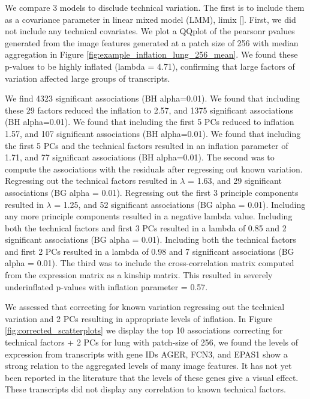 \documentclass[graybox]{svmult}
\begin{document}
We compare 3 models to disclude technical variation.
The first is to include them as a covariance parameter in linear mixed model (LMM), limix []. First, we did not include any technical covariates. We plot a QQplot of the pearsonr pvalues generated from the image features generated at a patch size of 256 with median aggregation in Figure \ref{fig:example_inflation_lung_256_mean}. We found these p-values to be highly inflated (lambda = 4.71), confirming that large factors of variation affected large groups of transcripts. 


We find 4323 significant associations (BH alpha=0.01). We found that including these 29 factors reduced the inflation to 2.57, and 1375 significant associations (BH alpha=0.01). We found that including the first 5 PCs reduced to inflation 1.57, and 107 significant associations (BH alpha=0.01). We found that including the first 5 PCs and the technical factors resulted in an inflation parameter of 1.71, and 77 significant associations (BH alpha=0.01).
The second was to compute the associations with the residuals after regressing out known variation. Regressing out the technical factors resulted in $\lambda$ = 1.63, and 29 significant associations (BG alpha = 0.01).  Regressing out the first 3 principle components resulted in $\lambda$ = 1.25, and 52 significant associations (BG alpha = 0.01). Including any more principle components resulted in a negative lambda value. Including both the technical factors and first 3 PCs resulted in a lambda of 0.85 and 2 significant associations (BG alpha = 0.01). Including both the technical factors and first 2 PCs resulted in a lambda of 0.98 and 7 significant associations (BG alpha = 0.01).
The third was to include the cross-correlation matrix computed from the expression matrix as a kinship matrix. This resulted in severely underinflated p-values with inflation parameter = 0.57.
 
We assessed that correcting for known variation regressing out the technical variation and 2 PCs resulting in appropriate levels of inflation. In Figure \ref{fig:corrected_scatterplots} we display the top 10 associations correcting for technical factors + 2 PCs for lung with patch-size of 256, we found the levels of expression from transcripts with gene IDs AGER, FCN3, and EPAS1 show a strong relation to the aggregated levels of many image features. It has not yet been reported in the literature that the levels of these genes give a visual effect. These transcripts did not display any correlation to known technical factors.
\end{document}
